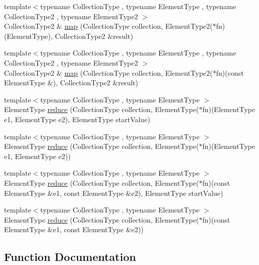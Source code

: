 \begin{DoxyCompactItemize}
\item 
{\footnotesize template$<$typename Collection\+Type , typename Element\+Type , typename Collection\+Type2 , typename Element\+Type2 $>$ }\\Collection\+Type2 \& \mbox{\hyperlink{namespacefunctional_a434d0f617a331cc413c711d1039e6466}{map}} (Collection\+Type collection, Element\+Type2($\ast$fn)(Element\+Type), Collection\+Type2 \&result)
\item 
{\footnotesize template$<$typename Collection\+Type , typename Element\+Type , typename Collection\+Type2 , typename Element\+Type2 $>$ }\\Collection\+Type2 \& \mbox{\hyperlink{namespacefunctional_a953a6d73bb5771ed9d20dc56eac0959f}{map}} (Collection\+Type collection, Element\+Type2($\ast$fn)(const Element\+Type \&), Collection\+Type2 \&result)
\item 
{\footnotesize template$<$typename Collection\+Type , typename Element\+Type $>$ }\\Element\+Type \mbox{\hyperlink{namespacefunctional_a5399d3c6ee43124afca8e8bce539312a}{reduce}} (Collection\+Type collection, Element\+Type($\ast$fn)(Element\+Type e1, Element\+Type e2), Element\+Type start\+Value)
\item 
{\footnotesize template$<$typename Collection\+Type , typename Element\+Type $>$ }\\Element\+Type \mbox{\hyperlink{namespacefunctional_a707ee32d465e1aac105f7e58e0212e5a}{reduce}} (Collection\+Type collection, Element\+Type($\ast$fn)(Element\+Type e1, Element\+Type e2))
\item 
{\footnotesize template$<$typename Collection\+Type , typename Element\+Type $>$ }\\Element\+Type \mbox{\hyperlink{namespacefunctional_a06b2f43d0a2b896f975500f36b38246e}{reduce}} (Collection\+Type collection, Element\+Type($\ast$fn)(const Element\+Type \&e1, const Element\+Type \&e2), Element\+Type start\+Value)
\item 
{\footnotesize template$<$typename Collection\+Type , typename Element\+Type $>$ }\\Element\+Type \mbox{\hyperlink{namespacefunctional_a8c8e88003f7c24bbdd1d9a2d029dde1d}{reduce}} (Collection\+Type collection, Element\+Type($\ast$fn)(const Element\+Type \&e1, const Element\+Type \&e2))
\end{DoxyCompactItemize}


\subsection{Function Documentation}
\mbox{\label{namespacefunctional_a18cb8a9ea2f81ed7b9697cac15b03453}} 

